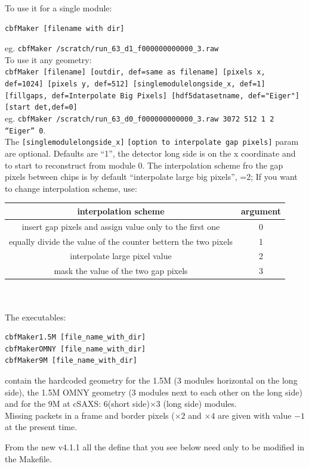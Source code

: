 \documentclass{article}
\begin{document}
{{{To use it for a single module:
\begin{verbatim}
cbfMaker [filename with dir]
\end{verbatim}
eg.
{\tt{cbfMaker /scratch/run\_63\_d1\_f000000000000\_3.raw}}\\

To use it any geometry:\\
{\tt{cbfMaker [filename] [outdir, def=same as filename] [pixels x, def=1024] [pixels y, def=512] [singlemodulelongside\_x, def=1] [fillgaps, def=Interpolate Big Pixels] [hdf5datasetname, def="Eiger"] [start det,def=0]}}\\
eg.
{\tt cbfMaker /scratch/run\_63\_d0\_f000000000000\_3.raw  3072 512 1 2 ``Eiger'' 0}.\\

The {\tt{[singlemodulelongside\_x]}} {\tt{[option to interpolate gap pixels]}} param are optional. Defaults are ``1'', the detector long side is on the x coordinate and to start to reconstruct from module 0.
The interpolation scheme fro the gap pixels between chips is by default ``interpolate large big pixels'', =2;
If you want to change interpolation scheme, use:\\
\begin{tabular}{|c|c|}
\hline
interpolation scheme & argument\\
\hline
insert gap pixels and assign value only to the first one  & 0\\
\hline
equally divide the value of the counter bettern the two pixels & 1\\
\hline
interpolate large pixel value & 2\\
\hline
mask the value of the two gap pixels & 3\\
\hline
\end{tabular}
\ \\
\ \\ 
The executables: 
\begin{verbatim}
cbfMaker1.5M [file_name_with_dir]
cbfMakerOMNY [file_name_with_dir]
cbfMaker9M [file_name_with_dir]
\end{verbatim}
contain the hardcoded geometry for the 1.5M (3 modules horizontal on the long side), the 1.5M OMNY geometry (3 modules next to each other on the long side) and for the 9M at cSAXS: 6(short side)$\times$3 (long side) modules.\\ 
Missing packets in a frame and border pixels ($\times 2$ and $\times 4$ are given with value $-1$ at the present time.

From the new {{v4.1.1}} all the define that you see below need only to be modified in the Makefile.

}}}
\end{document}
